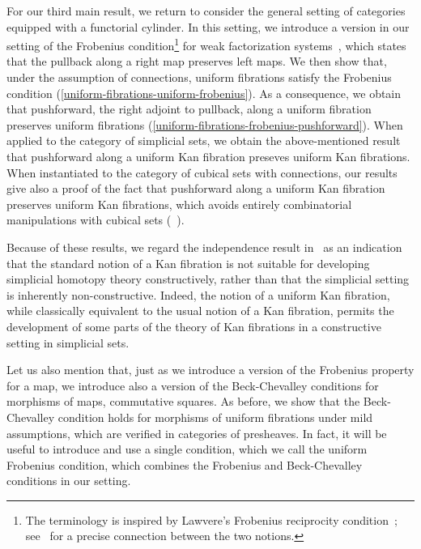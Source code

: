 \documentclass[reqno,10pt,a4paper,oneside,draft]{amsart}
\begin{document}
For our third main result, we return to consider the general setting of categories equipped with a functorial cylinder.
In this setting, we introduce a version in our setting of the Frobenius condition\footnote{The terminology is inspired by Lawvere's Frobenius reciprocity condition~\cite{lawvere-equality}; see~\cite{clementino:frobenius} for a precise connection between the two notions.} for weak factorization systems~\cite{garner:types-omega-groupoids}, which states that the pullback along a right map preserves left maps.
We then show that, under the assumption of connections, uniform fibrations satisfy the Frobenius condition (\cref{uniform-fibrations-uniform-frobenius}).
As a consequence, we obtain that pushforward, \ie the right adjoint to pullback, along a uniform fibration preserves uniform fibrations (\cref{uniform-fibrations-frobenius-pushforward}).
When applied to the category of simplicial sets, we obtain the above-mentioned result that pushforward along a uniform Kan fibration preseves uniform Kan fibrations.
When instantiated to the category of cubical sets with connections, our results give also a proof of the fact that pushforward along a uniform Kan fibration preserves uniform Kan fibrations, which avoids entirely combinatorial manipulations with cubical sets (\cf~\cite{coquand-face,coquand-variation,huber-thesis}).

Because of these results, we regard the independence result in~\cite{coquand-non-constructivity-kan} as an indication that the standard notion of a Kan fibration is not suitable for developing simplicial homotopy theory constructively, rather than that the simplicial setting is inherently non-constructive.
Indeed, the notion of a uniform Kan fibration, while classically equivalent to the usual notion of a Kan fibration, permits the development of some parts of the theory of Kan fibrations in a constructive setting in simplicial sets.

Let us also mention that, just as we introduce a version of the Frobenius property for a map, we introduce also a version of the Beck-Chevalley conditions for morphisms of maps, \ie commutative squares.
As before, we show that the Beck-Chevalley condition holds for morphisms of uniform fibrations under mild assumptions, which are verified in categories of presheaves.
In fact, it will be useful to introduce and use a single condition, which we call the uniform Frobenius condition, which combines the Frobenius and Beck-Chevalley conditions in our setting.
\end{document}
